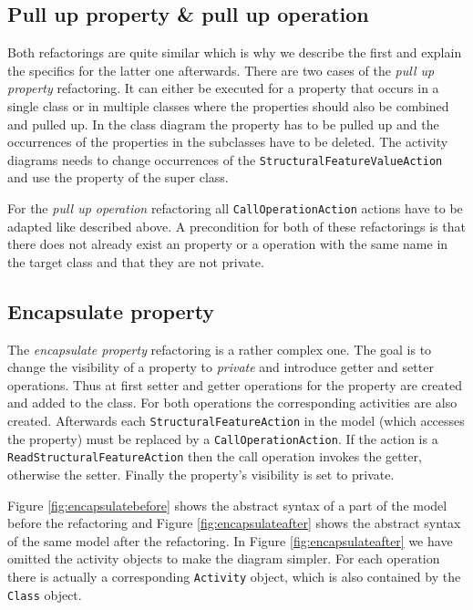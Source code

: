 \documentclass{llncs}
\begin{document}

\subsection{Pull up property \& pull up operation}
\label{sec:pullup}
Both refactorings are quite similar which is why we describe the first and explain the specifics for the latter one afterwards. 
There are two cases of the \textit{pull up property} refactoring. It can either be executed for a property that occurs in 
a single class or in multiple classes where the properties should also be combined and pulled up. In the class diagram 
the property has to be pulled up and the occurrences of the properties in the subclasses have to be deleted. The 
activity diagrams needs to change occurrences of the \texttt{StructuralFeatureValueAction} and use the property of 
the super class.

For the \textit{pull up operation} refactoring all \texttt{Call\-Operation\-Action} actions have to be adapted like described 
above. A precondition for both of these refactorings is that there does not already exist an property or a operation with the same name 
in the target class and that they are not private.

\subsection{Encapsulate property}
\label{sec:encapsulate}
The \textit{encapsulate property} refactoring is a rather complex one. The goal is to change the visibility of a property to 
\textit{private} and introduce getter and setter operations. Thus at first setter and getter operations for the property are created and
added to the class. For both operations the corresponding activities are also created. Afterwards each 
\texttt{Structural\-Feature\-Action} in the model (which accesses the property) must be replaced by a \texttt{Call\-Operation\-Action}. If 
the action is a 
\texttt{Read\-Structural\-Feature\-Action} then the call operation invokes the getter, otherwise the setter. Finally the property's 
visibility is set to private.

Figure \ref{fig:encapsulatebefore} shows the abstract syntax of a part of the model before the refactoring and
Figure \ref{fig:encapsulateafter} shows the abstract syntax of the same model after the refactoring. In Figure \ref{fig:encapsulateafter} 
we have omitted the activity objects to make the diagram simpler. For each operation there is actually a corresponding \texttt{Activity} 
object, which is also contained by the \texttt{Class} object.
\end{document}
